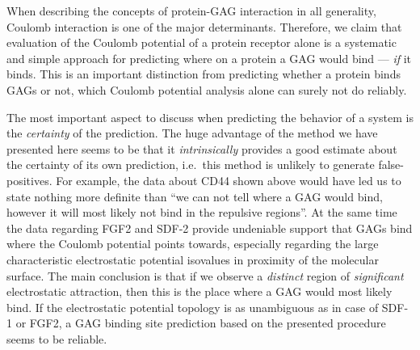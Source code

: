 When describing the concepts of protein-GAG interaction in all generality,
Coulomb interaction is one of the major determinants. Therefore, we claim that
evaluation of the Coulomb potential of a protein receptor alone is a systematic
and simple approach for predicting where on a protein a GAG would bind ---
\textit{if} it binds. This is an important distinction from predicting whether a
protein binds GAGs or not, which Coulomb potential analysis alone can surely not
do reliably.

The most important aspect to discuss when predicting the behavior of a system is
the \textit{certainty} of the prediction. The huge advantage of the method we
have presented here seems to be that it \textit{intrinsically} provides a good
estimate about the certainty of its own prediction, i.e.\ this method is
unlikely to generate false-positives. For example, the data about CD44 shown
above would have led us to state nothing more definite than \enquote{we can not
tell where a GAG would bind, however it will most likely not bind in the
repulsive regions}. At the same time the data regarding FGF2 and SDF-2 provide
undeniable support that GAGs bind where the Coulomb potential points towards,
especially regarding the large characteristic electrostatic potential isovalues
in proximity of the molecular surface. The main conclusion is that if we observe
a \textit{distinct} region of \textit{significant} electrostatic attraction,
then this is the place where a GAG would most likely bind. If the electrostatic
potential topology is as unambiguous as in case of SDF-1 or FGF2, a GAG binding
site prediction based on the presented procedure seems to be reliable.

